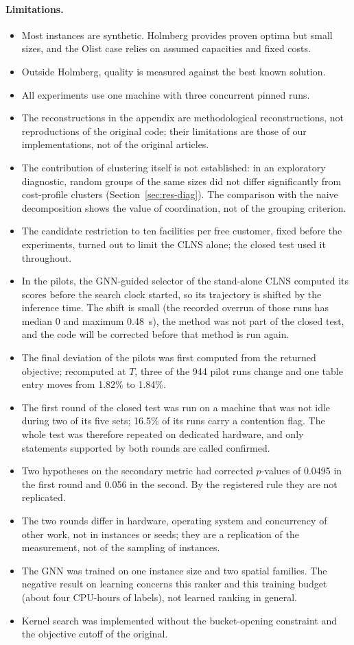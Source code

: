 \paragraph{Limitations.}
\begin{itemize}
\item Most instances are synthetic. Holmberg provides proven optima but small sizes, and the
Olist case relies on assumed capacities and fixed costs.
\item Outside Holmberg, quality is measured against the best known solution.
\item All experiments use one machine with three concurrent pinned runs.
\item The reconstructions in the appendix are methodological reconstructions, not reproductions
of the original code; their limitations are those of our implementations, not of the original
articles.
\item The contribution of clustering itself is not established: in an exploratory diagnostic,
random groups of the same sizes did not differ significantly from cost-profile clusters
(Section~\ref{sec:res-diag}). The comparison with the naive decomposition shows the value of
coordination, not of the grouping criterion.
\item The candidate restriction to ten facilities per free customer, fixed before the experiments,
turned out to limit the CLNS alone; the closed test used it throughout.
\item In the pilots, the GNN-guided selector of the stand-alone CLNS computed its scores before
the search clock started, so its trajectory is shifted by the inference time. The shift is small
(the recorded overrun of those runs has median 0 and maximum 0.48~s), the method was not part of
the closed test, and the code will be corrected before that method is run again.
\item The final deviation of the pilots was first computed from the returned objective; recomputed
at $T$, three of the 944 pilot runs change and one table entry moves from 1.82\% to 1.84\%.
\item The first round of the closed test was run on a machine that was not idle during two of
its five sets; 16.5\% of its runs carry a contention flag. The whole test was therefore repeated
on dedicated hardware, and only statements supported by both rounds are called confirmed.
\item Two hypotheses on the secondary metric had corrected $p$-values of 0.0495 in the first round
and 0.056 in the second. By the registered rule they are not replicated.
\item The two rounds differ in hardware, operating system and concurrency of other work, not in
instances or seeds; they are a replication of the measurement, not of the sampling of instances.
\item The GNN was trained on one instance size and two spatial families. The negative result on
learning concerns this ranker and this training budget (about four CPU-hours of labels), not
learned ranking in general.
\item Kernel search was implemented without the bucket-opening constraint and the objective
cutoff of the original.
\end{itemize}
